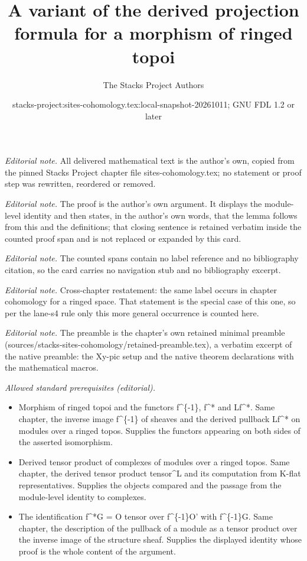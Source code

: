 \documentclass[10pt,a4paper]{amsart}
\title{A variant of the derived projection formula for a morphism of ringed topoi}
\author{The Stacks Project Authors}
\date{stacks-project:sites-cohomology.tex:local-snapshot-20261011; GNU FDL 1.2 or later}
\theoremstyle{plain}
\theoremstyle{definition}
\theoremstyle{remark}
\numberwithin{equation}{subsection}
\begin{document}
\maketitle
\noindent\textit{Editorial note.} All delivered mathematical text is the author's own, copied from the pinned Stacks Project chapter file sites-cohomology.tex; no statement or proof step was rewritten, reordered or removed.\par\medskip
\noindent\textit{Editorial note.} The proof is the author's own argument. It displays the module-level identity and then states, in the author's own words, that the lemma follows from this and the definitions; that closing sentence is retained verbatim inside the counted proof span and is not replaced or expanded by this card.\par\medskip
\noindent\textit{Editorial note.} The counted spans contain no label reference and no bibliography citation, so the card carries no navigation stub and no bibliography excerpt.\par\medskip
\noindent\textit{Editorial note.} Cross-chapter restatement: the same label occurs in chapter cohomology for a ringed space. That statement is the special case of this one, so per the lane-s4 rule only this more general occurrence is counted here.\par\medskip
\noindent\textit{Editorial note.} The preamble is the chapter's own retained minimal preamble (sources/stacks-sites-cohomology/retained-preamble.tex), a verbatim excerpt of the native preamble: the Xy-pic setup and the native theorem declarations with the mathematical macros.\par\medskip
\noindent\textit{Allowed standard prerequisites (editorial).}\begin{itemize}
\item Morphism of ringed topoi and the functors f\textasciicircum{}\{-1\}, f\textasciicircum{}* and Lf\textasciicircum{}*. Same chapter, the inverse image f\textasciicircum{}\{-1\} of sheaves and the derived pullback Lf\textasciicircum{}* on modules over a ringed topos. Supplies the functors appearing on both sides of the asserted isomorphism.
\item Derived tensor product of complexes of modules over a ringed topos. Same chapter, the derived tensor product tensor\textasciicircum{}L and its computation from K-flat representatives. Supplies the objects compared and the passage from the module-level identity to complexes.
\item The identification f\textasciicircum{}*G = O tensor over f\textasciicircum{}\{-1\}O' with f\textasciicircum{}\{-1\}G. Same chapter, the description of the pullback of a module as a tensor product over the inverse image of the structure sheaf. Supplies the displayed identity whose proof is the whole content of the argument.
\end{itemize}\medskip
\end{document}
